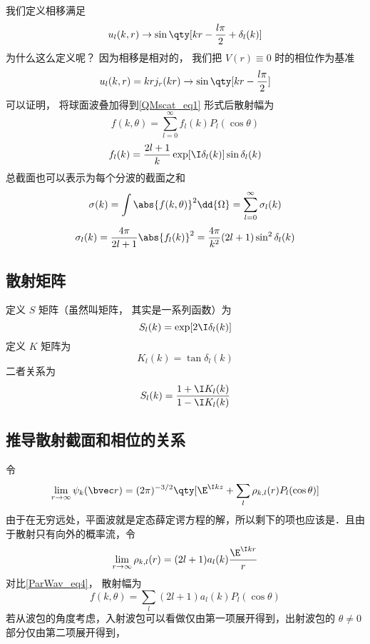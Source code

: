 我们定义相移满足
\begin{equation}
u_l(k, r) \to \sin\qty[kr - \frac{l\pi}{2} + \delta_l(k)]
\end{equation}
为什么这么定义呢？ 因为相移是相对的， 我们把 $V(r) \equiv 0$ 时的相位作为基准
\begin{equation}
u_l(k, r) = kr j_r(kr) \to \sin\qty[kr - \frac{l\pi}{2}]
\end{equation}
可以证明， 将球面波叠加得到\autoref{QMscat_eq1} 形式后散射幅为
\begin{equation}
f(k, \theta) = \sum_{l=0}^\infty f_l(k) P_l(\cos\theta)
\end{equation}
\begin{equation}
f_l(k) = \frac{2l+1}{k} \exp[\I\delta_l(k)] \sin\delta_l (k)
\end{equation}
总截面也可以表示为每个分波的截面之和
\begin{equation}
\sigma(k) = \int \abs{f(k,\theta)}^2 \dd{\Omega} = \sum_{l=0}^\infty \sigma_l(k)
\end{equation}
\begin{equation}
\sigma_l(k) = \frac{4\pi}{2l+1} \abs{f_l(k)}^2 = \frac{4\pi}{k^2} (2l + 1) \sin^2 \delta_l(k)
\end{equation}

\subsection{散射矩阵}
定义 $S$ 矩阵（虽然叫矩阵， 其实是一系列函数）为
\begin{equation}
S_l(k) = \exp[2\I\delta_l(k)]
\end{equation}
定义 $K$ 矩阵为
\begin{equation}
K_l(k) = \tan \delta_l(k)
\end{equation}
二者关系为
\begin{equation}
S_l(k) = \frac{1 + \I K_l(k)}{1 - \I K_l(k)}
\end{equation}

\subsection{推导散射截面和相位的关系}
令
\begin{equation}
\lim_{r\to \infty} \psi_k(\bvec r) = (2\pi)^{-3/2} \qty[\E^{\I kz} + \sum_l \rho_{k,l}(r) P_l(\cos \theta)]
\end{equation}
由于在无穷远处，平面波就是定态薛定谔方程的解，所以剩下的项也应该是．且由于散射只有向外的概率流，令
\begin{equation}\label{ParWav_eq8}
\lim_{r \to \infty} \rho_{k,l}(r) = (2l + 1){a_l}(k)\frac{\E^{\I kr}}{r}
\end{equation}
对比\autoref{ParWav_eq4}， 散射幅为
\begin{equation}
f(k,\theta) = \sum_l (2l + 1) a_l(k) P_l(\cos \theta)
\end{equation}
若从波包的角度考虑，入射波包可以看做仅由第一项展开得到，出射波包的 $\theta  \ne 0$ 部分仅由第二项展开得到，

